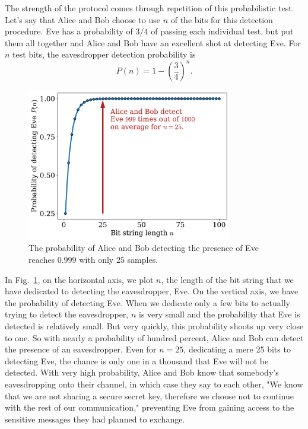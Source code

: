 The strength of the protocol comes through repetition of this probabilistic test.  Let's say that Alice and Bob choose to use $n$ of the bits for this detection procedure.  Eve has a probability of $3/4$ of passing each individual test, but put them all together and Alice and Bob have an excellent shot at detecting Eve.  For $n$ test bits, the eavesdropper detection probability is
\begin{equation}
P(n)=1-\left(\frac{3}{4}\right)^n.
\end{equation}

\begin{figure}[H]
    \centering
    \includegraphics[width=0.8\textwidth]{lesson9/9-4_detection.pdf}
        \caption[Probability of detecting the presence of Eve]{The probability of Alice and Bob detecting the presence of Eve reaches $0.999$ with only $25$ samples.}
    \label{fig:catching-eve}
\end{figure}

In Fig.~\ref{fig:catching-eve}, on the horizontal axis, we plot $n$, the length of the bit string that we have dedicated to detecting the eavesdropper, Eve. On the vertical axis, we have the probability of detecting Eve.  When we dedicate only a few bits to actually trying to detect the eavesdropper, $n$ is very small and the probability that Eve is detected is relatively small. But very quickly, this probability shoots up very close to one. So with nearly a probability of hundred percent, Alice and Bob can detect the presence of an eavesdropper. Even for $n = 25$, dedicating a mere 25 bits to detecting Eve, the chance is only one in a thousand that Eve will not be detected.  With very high probability, Alice and Bob know that somebody's eavesdropping onto their channel, in which case they say to each other, "We know that we are not sharing a secure secret key, therefore we choose not to continue with the rest of our communication," preventing Eve from gaining access to the sensitive messages they had planned to exchange.

